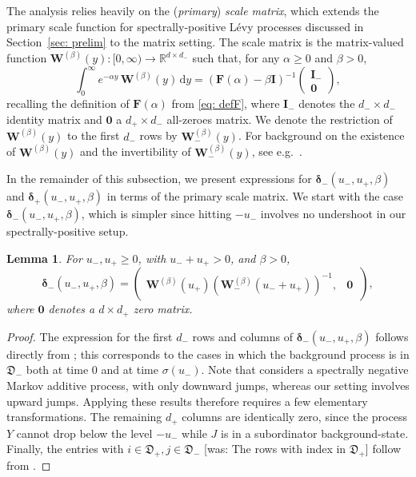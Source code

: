 \documentclass[reqno,12pt]{amsart}
\newcommand{\bs}{\boldsymbol}
\newcommand{\defDmin}{{\mathfrak D}_-}
\newcommand{\defDplus}{{\mathfrak D}_+}
\newtheorem{lemma}{Lemma}
\begin{document}
{The analysis relies heavily on the (\emph{primary}) \emph{scale matrix}, which extends the primary scale function for spectrally-positive L\'evy processes discussed in Section~\ref{sec: prelim} to the matrix setting. The scale matrix is the matrix-valued function $\bs{W}^{(\beta)}(y): [0,\infty) \to \mathbb{R}^{d\times d_-}$ such that, for any $\alpha\geqslant 0$ and $\beta>0$,
\begin{equation*}
    \int_{0}^\infty e^{-\alpha y} \,\bs{W}^{(\beta)}(y)\,\mathrm{d}y = \left(\bs F(\alpha) - \beta\bs{I}\right)^{-1}
    \begin{pmatrix}
        \bs{I}_- \\
        \bs{0}
    \end{pmatrix},
\end{equation*}
recalling the definition of $\bs F(\alpha)$ from \eqref{eq: defF}, where ${\bs I}_-$ denotes the $d_- \times d_-$ identity matrix and $\bs{0}$ a $d_+ \times d_-$ all-zeroes matrix. We denote the restriction of $\bs{W}^{(\beta)}(y)$ to the first $d_-$ rows by $\bs{W}_-^{(\beta)}(y)$. 
For background on the existence of $\bs{W}^{(\beta)}(y)$ and the invertibility of $\bs{W}_-^{(\beta)}(y)$, see e.g.\ \cite{IP}.


In the remainder of this subsection, we present expressions for ${\bs \delta}_{-}(u_-, u_+, \beta)$ and ${\bs \delta}_{+}(u_-, u_+, \beta)$ in terms of the primary scale matrix. We start with the case ${\bs \delta}_{-}(u_-, u_+, \beta)$, which is simpler since hitting $-u_-$ involves no undershoot in our spectrally-positive setup.

\begin{lemma}\label{lemma: delta_-}
    For $u_-, u_+ \geqslant 0$, with $u_- + u_+ > 0$, and $\beta > 0$,
    \begin{equation}
        {\bs \delta}_{-}(u_-, u_+, \beta) = \begin{pmatrix}\bs{W}^{(\beta)}(u_+)\left(\bs{W}_-^{(\beta)}(u_-+u_+)\right)^{-1} ,& \bs{0}\,\end{pmatrix},
    \end{equation}
    where $\bs{0}$ denotes a $d\times d_+$ zero matrix.
\end{lemma}
\begin{proof}
   The expression for the first $d_-$ rows and columns of $\bs\delta_-(u_-,u_+,\beta)$ follows directly from \cite[Theorem 1]{IP}; this corresponds to the cases in which the background process is in $\defDmin $ both at time 0 and at time $\sigma(u_-)$. Note that \cite{IP} considers a spectrally negative Markov additive process, with only downward jumps, whereas our setting involves upward jumps. Applying these results therefore requires a few elementary transformations. The remaining $d_+$ columns are identically zero, since the process $Y$ cannot drop below the level $-u_-$ while $J$ is in a subordinator background-state. Finally, the entries with $i\in\defDplus, j\in\defDmin$ [was: The rows with index in $\defDplus $] follow from \cite[\S 7.6]{thesis_IV}.
\end{proof}

}
\end{document}
